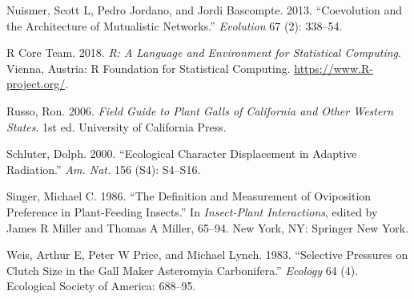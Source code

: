 \documentclass[]{elsarticle} %
\begin{document}
\hypertarget{ref-Nuismer2013}{}
Nuismer, Scott L, Pedro Jordano, and Jordi Bascompte. 2013.
``Coevolution and the Architecture of Mutualistic Networks.''
\emph{Evolution} 67 (2): 338--54.

\hypertarget{ref-R2018}{}
R Core Team. 2018. \emph{R: A Language and Environment for Statistical
Computing}. Vienna, Austria: R Foundation for Statistical Computing.
\url{https://www.R-project.org/}.

\hypertarget{ref-Russo2006}{}
Russo, Ron. 2006. \emph{Field Guide to Plant Galls of California and
Other Western States}. 1st ed. University of California Press.

\hypertarget{ref-Schluter2000}{}
Schluter, Dolph. 2000. ``Ecological Character Displacement in Adaptive
Radiation.'' \emph{Am. Nat.} 156 (S4): S4--S16.

\hypertarget{ref-Singer1986}{}
Singer, Michael C. 1986. ``The Definition and Measurement of Oviposition
Preference in Plant-Feeding Insects.'' In \emph{Insect-Plant
Interactions}, edited by James R Miller and Thomas A Miller, 65--94. New
York, NY: Springer New York.

\hypertarget{ref-Weis1983}{}
Weis, Arthur E, Peter W Price, and Michael Lynch. 1983. ``Selective
Pressures on Clutch Size in the Gall Maker Asteromyia Carbonifera.''
\emph{Ecology} 64 (4). Ecological Society of America: 688--95.
\end{document}
